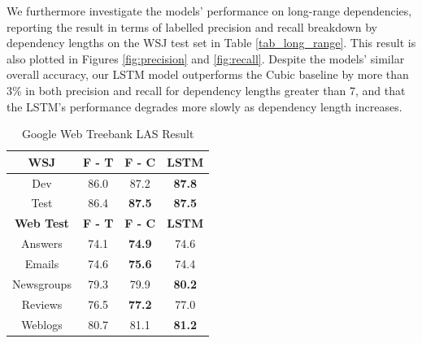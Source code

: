 We furthermore investigate the models' performance on long-range dependencies, reporting the result in terms of labelled precision and recall breakdown by dependency lengths on the WSJ test set in Table \ref{tab_long_range}. This result is also plotted in Figures \ref{fig:precision} and \ref{fig:recall}. 
Despite the models' similar overall accuracy, our LSTM model outperforms the Cubic baseline by more than 3\% in both precision and recall for dependency lengths greater than 7, and that the LSTM's performance degrades more slowly as dependency length increases.


\begin{table}[t]
\centering
\begin{tabular}{|c|c|c|c|}
\hline
{\bf WSJ} & {\bf F - T} & {\bf F - C} & {\bf LSTM} \\ \hline
Dev             & 86.0        & 87.2        & {\bf 87.8} \\ \hline
Test            & 86.4        & {\bf 87.5}  & {\bf 87.5} \\ \hline \hline
{\bf Web Test}       & {\bf F - T} & {\bf F - C} & {\bf LSTM} \\ \hline
Answers         & 74.1        & {\bf 74.9}  & 74.6       \\ \hline
Emails          & 74.6        & {\bf 75.6}  & 74.4       \\ \hline
Newsgroups      & 79.3        & 79.9        & {\bf 80.2} \\ \hline
Reviews         & 76.5        & {\bf 77.2}  & 77.0       \\ \hline
Weblogs         & 80.7        & 81.1        & {\bf 81.2} \\ \hline
\end{tabular}
\caption{Google Web Treebank LAS Result}
\label{full_result_table}
\end{table}



